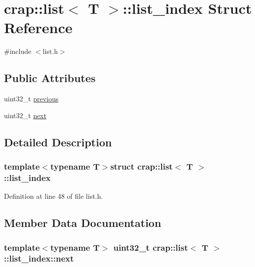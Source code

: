 \hypertarget{structcrap_1_1list_1_1list__index}{}\section{crap\+:\+:list$<$ T $>$\+:\+:list\+\_\+index Struct Reference}
\label{structcrap_1_1list_1_1list__index}


{\ttfamily \#include $<$list.\+h$>$}

\subsection*{Public Attributes}
\begin{DoxyCompactItemize}
\item 
uint32\+\_\+t \hyperlink{structcrap_1_1list_1_1list__index_a16be27e9969e8256df96367d8de4c325}{previous}
\item 
uint32\+\_\+t \hyperlink{structcrap_1_1list_1_1list__index_a85ebc5cb08981041d102ee1a3d9f3cec}{next}
\end{DoxyCompactItemize}


\subsection{Detailed Description}
\subsubsection*{template$<$typename T$>$struct crap\+::list$<$ T $>$\+::list\+\_\+index}



Definition at line 48 of file list.\+h.



\subsection{Member Data Documentation}
\hypertarget{structcrap_1_1list_1_1list__index_a85ebc5cb08981041d102ee1a3d9f3cec}{}
\subsubsection[{next}]{\setlength{\rightskip}{0pt plus 5cm}template$<$typename T$>$ uint32\+\_\+t {\bf crap\+::list}$<$ T $>$\+::list\+\_\+index\+::next}\label{structcrap_1_1list_1_1list__index_a85ebc5cb08981041d102ee1a3d9f3cec}


